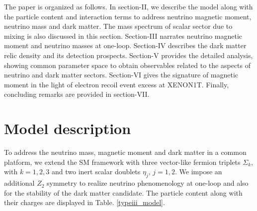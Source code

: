 \documentclass[aps, a4paper,superscriptaddress,12pt,preprintnumbers,floatfix,nofootinbib,amsmath,amssymb]{revtex4}
\begin{document}
The paper is organized as follows. In section-II, we describe the model along with the particle content and interaction terms to address neutrino magnetic moment, neutrino mass and dark matter. The mass spectrum of scalar sector due to mixing is also discussed in this section. Section-III  narrates neutrino magnetic moment and neutrino masses at one-loop. Section-IV describes the   dark matter relic density and its detection prospects. Section-V provides the detailed analysis, showing common parameter space to obtain observables related to the aspects of neutrino and dark matter sectors. Section-VI gives the signature of magnetic moment in the light of electron recoil event excess at XENON1T. Finally, concluding remarks are provided in section-VII.

\section{Model description}
To address the neutrino mass,  magnetic moment and dark matter in a common platform, we extend the SM framework with three vector-like fermion triplets $\Sigma_k$, with $k=1,2,3$ and two inert scalar doublets $\eta_j$,  $j=1,2$. We impose an additional $Z_2$ symmetry to realize neutrino phenomenology at one-loop and also for the stability of the dark matter candidate. The particle content along with their charges are displayed in Table. \ref{typeiii_model}.
\end{document}
